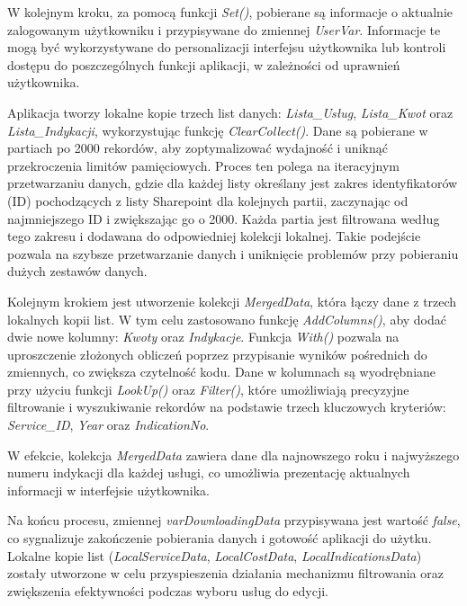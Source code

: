 W kolejnym kroku, za pomocą funkcji \emph{Set()}, pobierane są informacje o aktualnie zalogowanym użytkowniku i przypisywane do zmiennej \emph{UserVar}. Informacje te mogą być wykorzystywane do personalizacji interfejsu użytkownika lub kontroli dostępu do poszczególnych funkcji aplikacji, w zależności od uprawnień użytkownika.

Aplikacja tworzy lokalne kopie trzech list danych: \emph{Lista\_Usług}, \emph{Lista\_Kwot} oraz \emph{Lista\_Indykacji}, wykorzystując funkcję \emph{ClearCollect()}. Dane są pobierane w partiach po 2000 rekordów, aby zoptymalizować wydajność i uniknąć przekroczenia limitów pamięciowych. Proces ten polega na iteracyjnym przetwarzaniu danych, gdzie dla każdej listy określany jest zakres identyfikatorów (ID) pochodzących z listy Sharepoint dla kolejnych partii, zaczynając od najmniejszego ID i zwiększając go o 2000. Każda partia jest filtrowana według tego zakresu i dodawana do odpowiedniej kolekcji lokalnej. Takie podejście pozwala na szybsze przetwarzanie danych i uniknięcie problemów przy pobieraniu dużych zestawów danych.

Kolejnym krokiem jest utworzenie kolekcji \emph{MergedData}, która łączy dane z trzech lokalnych kopii list. W tym celu zastosowano funkcję \emph{AddColumns()}, aby dodać dwie nowe kolumny: \emph{Kwoty} oraz \emph{Indykacje}. Funkcja \emph{With()} pozwala na uproszczenie złożonych obliczeń poprzez przypisanie wyników pośrednich do zmiennych, co zwiększa czytelność kodu. Dane w kolumnach są wyodrębniane przy użyciu funkcji \emph{LookUp()} oraz \emph{Filter()}, które umożliwiają precyzyjne filtrowanie i wyszukiwanie rekordów na podstawie trzech kluczowych kryteriów: \emph{Service\_ID}, \emph{Year} oraz \emph{IndicationNo}.

W efekcie, kolekcja \emph{MergedData} zawiera dane dla najnowszego roku i najwyższego numeru indykacji dla każdej usługi, co umożliwia prezentację aktualnych informacji w interfejsie użytkownika.

Na końcu procesu, zmiennej \emph{varDownloadingData} przypisywana jest wartość \emph{false}, co sygnalizuje zakończenie pobierania danych i gotowość aplikacji do użytku. Lokalne kopie list (\emph{LocalServiceData}, \emph{LocalCostData}, \emph{LocalIndicationsData}) zostały utworzone w celu przyspieszenia działania mechanizmu filtrowania oraz zwiększenia efektywności podczas wyboru usług do edycji.




